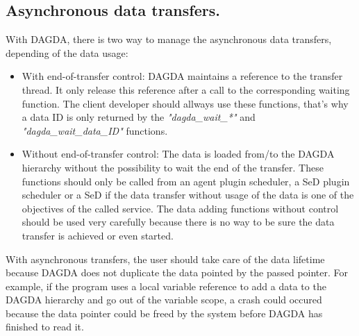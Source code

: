 \subsection{Asynchronous data transfers.}
With DAGDA, there is two way to manage the asynchronous data transfers,
depending of the data usage:
\begin{itemize}
  \item With end-of-transfer control: DAGDA maintains a reference to the
    transfer thread. It only release this reference after a call to the
    corresponding waiting function. The client developer should allways use
    these functions, that's why a data ID is only returned by the
    \textit{"dagda\_wait\_*"} and \textit{"dagda\_wait\_data\_ID"} functions.
  \item Without end-of-transfer control: The data is loaded from/to the
    DAGDA hierarchy without the possibility to wait the end of the transfer.
    These functions should only be called from an agent plugin scheduler, a
    SeD plugin scheduler or a SeD if the data transfer without usage of the
    data is one of the objectives of the called service. The data adding
    functions without control should be used very carefully because there is
    no way to be sure the data transfer is achieved or even started.    
\end{itemize}
With asynchronous transfers, the user should take care of the data lifetime
because DAGDA does not duplicate the data pointed by the passed pointer.
For example, if the program uses a local variable reference to add a data
to the DAGDA hierarchy and go out of the variable scope, a crash could
occured because the data pointer could be freed by the system before DAGDA has
finished to read it.
